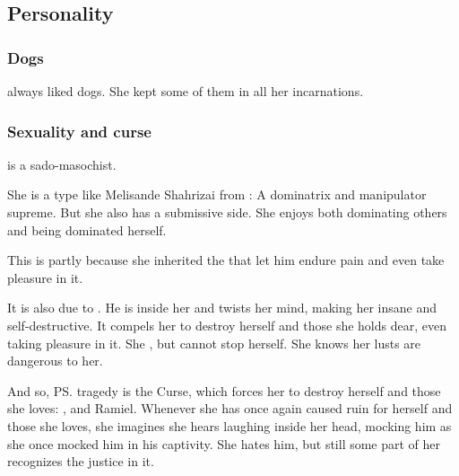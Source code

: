 \subsection{Personality}





\subsubsection{Dogs}
\Shiaraid{} always liked dogs. 
She kept some of them in all her incarnations. 





\subsubsection{Sexuality and curse}
\Shiaraid{} is a sado-masochist. 

She is a type like Melisande Shahrizai from : 
A dominatrix and manipulator supreme. 
But she also has a submissive side. 
She enjoys both dominating others and being dominated herself. 

This is partly because she inherited the  that let him endure pain and even take pleasure in it. 

It is also due to . 
He is inside her and twists her mind, making her insane and self-destructive. 
It compels her to destroy herself and those she holds dear, even taking pleasure in it. 
She , but cannot stop herself. 
She knows her lusts are dangerous to her. 

\begin{prose}
\end{prose}

And so, \ps{\Shiaraid} tragedy is the Curse, which forces her to destroy herself and those she loves: 
\Aryal, \Zachirah{} and Ramiel. 
Whenever she has once again caused ruin for herself and those she loves, she imagines she hears \Nexagglachel{} laughing inside her head, mocking him as she once mocked him in his captivity. 
She hates him, but still some part of her recognizes the justice in it. 










